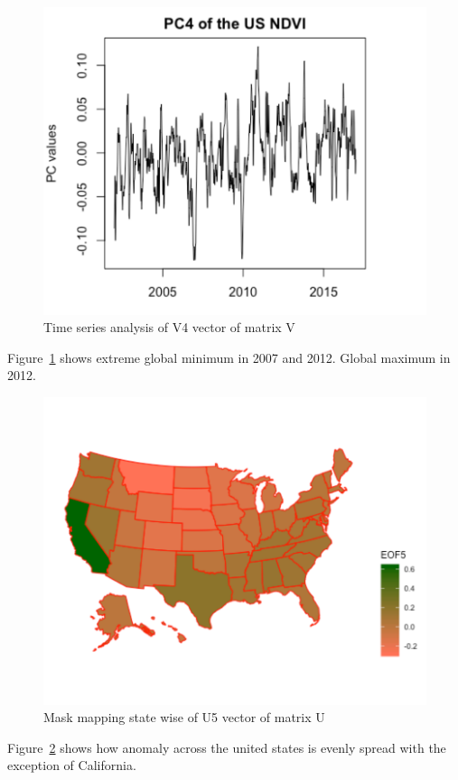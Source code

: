      \begin{figure}[H]
            \centering
            \includegraphics[width=0.70\linewidth]{figures/ch5/SVD/pc4.png}
            \caption{\label{fig:V_4} Time series analysis of V4 vector of matrix V}
    \end{figure}
    
    Figure~\ref{fig:V_4} shows extreme global minimum in 2007 and 2012. Global maximum in 2012. 


     \begin{figure}[H]
            \centering
            \includegraphics[width=0.70\linewidth]{figures/ch5/SVD/eof5.png}
            \caption{\label{fig:EOF_5} Mask mapping state wise of U5 vector of matrix U}
    \end{figure}
    
    Figure~\ref{fig:EOF_5} shows how anomaly across the united states is evenly spread with the exception of California.
    
